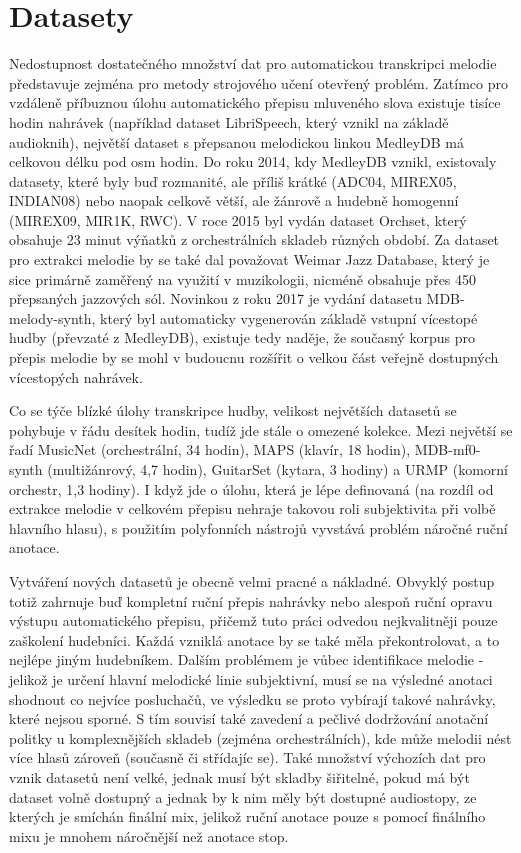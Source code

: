 \chapter{Datasety}

Nedostupnost dostatečného množství dat pro automatickou transkripci melodie představuje zejména pro metody strojového učení otevřený problém. Zatímco pro vzdáleně příbuznou úlohu automatického přepisu mluveného slova existuje tisíce hodin nahrávek (například dataset LibriSpeech, který vznikl na základě audioknih), největší dataset s přepsanou melodickou linkou MedleyDB má celkovou délku pod osm hodin. Do roku 2014, kdy MedleyDB vznikl, existovaly datasety, které byly buď rozmanité, ale příliš krátké (ADC04, MIREX05, INDIAN08) nebo naopak celkově větší, ale žánrově a hudebně homogenní (MIREX09, MIR1K, RWC). V roce 2015 byl vydán dataset Orchset, který obsahuje 23 minut výňatků z orchestrálních skladeb různých období. Za dataset pro extrakci melodie by se také dal považovat Weimar Jazz Database, který je sice primárně zaměřený na využití v muzikologii, nicméně obsahuje přes 450 přepsaných jazzových sól. Novinkou z roku 2017 je vydání datasetu MDB-melody-synth, který byl automaticky vygenerován základě vstupní vícestopé hudby (převzaté z MedleyDB), existuje tedy naděje, že současný korpus pro přepis melodie by se mohl v budoucnu rozšířit o velkou část veřejně dostupných vícestopých nahrávek.

Co se týče blízké úlohy transkripce hudby, velikost největších datasetů se pohybuje v řádu desítek hodin, tudíž jde stále o omezené kolekce. Mezi největší se řadí MusicNet (orchestrální, 34 hodin), MAPS (klavír, 18 hodin), MDB-mf0-synth (multižánrový, 4,7 hodin), GuitarSet (kytara, 3 hodiny) a URMP (komorní orchestr, 1,3 hodiny). I když jde o úlohu, která je lépe definovaná (na rozdíl od extrakce melodie v celkovém přepisu nehraje takovou roli subjektivita při volbě hlavního hlasu), s použitím polyfonních nástrojů vyvstává problém náročné ruční anotace.

Vytváření nových datasetů je obecně velmi pracné a nákladné. Obvyklý postup totiž zahrnuje buď kompletní ruční přepis nahrávky nebo alespoň ruční opravu výstupu automatického přepisu, přičemž tuto práci odvedou nejkvalitněji pouze zaškolení hudebníci. Každá vzniklá anotace by se také měla překontrolovat, a to nejlépe jiným hudebníkem. Dalším problémem je vůbec identifikace melodie - jelikož je určení hlavní melodické linie subjektivní, musí se na výsledné anotaci shodnout co nejvíce posluchačů, ve výsledku se proto vybírají takové nahrávky, které nejsou sporné. S tím souvisí také zavedení a pečlivé dodržování anotační politky u komplexnějších skladeb (zejména orchestrálních), kde může melodii nést více hlasů zároveň (současně či střídajíc se). Také množství výchozích dat pro vznik datasetů není velké, jednak musí být skladby šiřitelné, pokud má být dataset volně dostupný a jednak by k nim měly být dostupné audiostopy, ze kterých je smíchán finální mix, jelikož ruční anotace pouze s pomocí finálního mixu je mnohem náročnější než anotace stop.

